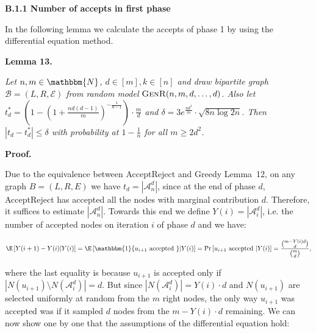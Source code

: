 \par\medskip\noindent\textbf{B.1.1 Number of accepts in first phase}\par




In the following lemma we calculate the accepts of phase 1 by using the differential equation method.\par





\par\medskip\noindent\textbf{\textbf{Lemma 13}\textbf{.}}\par



\emph{Let $n,m\in\mathbbm{N}$, $d\in[m],k\in[n]$ and draw bipartite graph $\mathcal{B}=(L,R,\mathcal{E})$ from random model $\textsc{GenR}(n,m,d,\dots,d)$.
Also let $t^{*}_{d}=\left(1-\left(1+\frac{nd(d-1)}{m}\right)^{-\frac{1}{d-1}}\right)\cdot\frac{m}{d}$ and $\delta=3e^{\frac{nd^{2}}{m}}\cdot\sqrt{8n\log{2n}}$.
Then $|t_{d}-t^{*}_{d}|\leq\delta$ with probability at $1-\frac{1}{n}$ for all $m\geq 2d^{2}$.}\par






\par\medskip\noindent\textbf{Proof.}\par



Due to the equivalence between AcceptReject and Greedy Lemma 12, on any graph $B=(L,R,E)$ we have $t_{d}=|\mathcal{A}^{d}_{n}|$, since at the end of phase $d$, AcceptReject has accepted all the nodes with marginal contribution $d$. Therefore, it suffices to estimate $|\mathcal{A}^{d}_{n}|$. Towards this end we define $Y(i)=|\mathcal{A}^{d}_{i}|$, i.e. the number of accepted nodes on iteration $i$ of phase $d$ and we have:\par


\[\begin{gathered}
\displaystyle\E\left[Y(i+1)-Y(i)\middle|Y(i)\right]=\E\left[\mathbbm{1}\{u_{i+1}\text{ accepted }\}\middle|Y(i)\right]=\Pr\left[u_{i+1}\text{ accepted }\middle|Y(i)\right]=\frac{\binom{m-Y(i)d}{d}}{\binom{m}{d}},
\end{gathered}\]


where the last equality is because $u_{i+1}$ is accepted only if $|N(u_{i+1})\setminus N(\mathcal{A}^{d}_{i})|=d$. But since $|N(\mathcal{A}^{d}_{i})|=Y(i)\cdot d$ and $N(u_{i+1})$ are selected uniformly at random from the $m$ right nodes, the only way $u_{i+1}$ was accepted was if it sampled $d$ nodes from the $m-Y(i)\cdot d$ remaining.
We can now show one by one that the assumptions of the differential equation hold:\par


